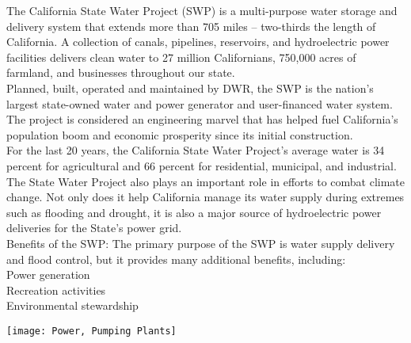 \documentclass{article}
\begin{document}
The California State Water Project (SWP) is a multi-purpose water storage and delivery system that extends more than 705 miles -- two-thirds the length of California. A collection of canals, pipelines, reservoirs, and hydroelectric power facilities delivers clean water to 27 million Californians, 750,000 acres of farmland, and businesses throughout our state.\\
\vspace{0.3cm}
Planned, built, operated and maintained by DWR, the SWP is the nation’s largest state-owned water and power generator and user-financed water system. The project is considered an engineering marvel that has helped fuel California’s population boom and economic prosperity since its initial construction.\\
\vspace{0.3cm}
For the last 20 years, the California State Water Project’s average water is 34 percent for agricultural and 66 percent for residential, municipal, and industrial.\\
\vspace{0.3cm}
The State Water Project also plays an important role in efforts to combat climate change. Not only does it help California manage its water supply during extremes such as flooding and drought, it is also a major source of hydroelectric power deliveries for the State's power grid.\\\vspace{0.3cm}
Benefits of the SWP:
The primary purpose of the SWP is water supply delivery and flood control, but it provides many additional benefits, including:\\
\vspace{0.3cm}
Power generation\\
Recreation activities\\
Environmental stewardship





\begin{center}
\texttt{[image: Power, Pumping Plants]}
\end{center}
\end{document}
